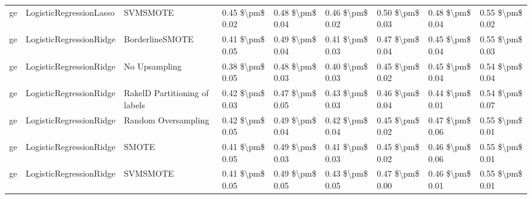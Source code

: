 \begin{tabular}{lllllllll}
      ge &         LogisticRegressionLasso &                      SVMSMOTE & 0.45 \$\textbackslash pm\$ 0.02 &           0.48 \$\textbackslash pm\$ 0.04 &       0.46 \$\textbackslash pm\$ 0.02 &        0.50 \$\textbackslash pm\$ 0.03 &                         0.48 \$\textbackslash pm\$ 0.04 &     0.55 \$\textbackslash pm\$ 0.02 \\
      ge &         LogisticRegressionRidge &               BorderlineSMOTE & 0.41 \$\textbackslash pm\$ 0.05 &           0.49 \$\textbackslash pm\$ 0.04 &       0.41 \$\textbackslash pm\$ 0.03 &        0.47 \$\textbackslash pm\$ 0.04 &                         0.45 \$\textbackslash pm\$ 0.04 &     0.55 \$\textbackslash pm\$ 0.03 \\
      ge &         LogisticRegressionRidge &                 No Upsampling & 0.38 \$\textbackslash pm\$ 0.05 &           0.48 \$\textbackslash pm\$ 0.03 &       0.40 \$\textbackslash pm\$ 0.03 &        0.45 \$\textbackslash pm\$ 0.02 &                         0.45 \$\textbackslash pm\$ 0.04 &     0.54 \$\textbackslash pm\$ 0.04 \\
      ge &         LogisticRegressionRidge & RakelD Partitioning of labels & 0.42 \$\textbackslash pm\$ 0.03 &           0.47 \$\textbackslash pm\$ 0.05 &       0.43 \$\textbackslash pm\$ 0.03 &        0.46 \$\textbackslash pm\$ 0.04 &                         0.44 \$\textbackslash pm\$ 0.01 &     0.54 \$\textbackslash pm\$ 0.07 \\
      ge &         LogisticRegressionRidge &           Random Oversampling & 0.42 \$\textbackslash pm\$ 0.05 &           0.49 \$\textbackslash pm\$ 0.04 &       0.42 \$\textbackslash pm\$ 0.04 &        0.45 \$\textbackslash pm\$ 0.02 &                         0.47 \$\textbackslash pm\$ 0.06 &     0.55 \$\textbackslash pm\$ 0.01 \\
      ge &         LogisticRegressionRidge &                         SMOTE & 0.41 \$\textbackslash pm\$ 0.05 &           0.49 \$\textbackslash pm\$ 0.03 &       0.41 \$\textbackslash pm\$ 0.03 &        0.45 \$\textbackslash pm\$ 0.02 &                         0.46 \$\textbackslash pm\$ 0.06 &     0.55 \$\textbackslash pm\$ 0.01 \\
      ge &         LogisticRegressionRidge &                      SVMSMOTE & 0.41 \$\textbackslash pm\$ 0.05 &           0.49 \$\textbackslash pm\$ 0.05 &       0.43 \$\textbackslash pm\$ 0.05 &        0.47 \$\textbackslash pm\$ 0.00 &                         0.46 \$\textbackslash pm\$ 0.01 &     0.55 \$\textbackslash pm\$ 0.01 \\

\end{tabular}
